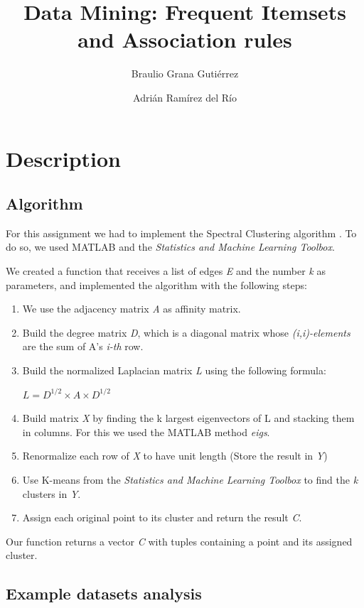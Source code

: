 \documentclass[12pt, a4paper]{article}
\title{Data Mining: Frequent Itemsets and Association rules}
\author{Braulio Grana Guti\'errez \and Adri\'an Ram\'irez del R\'io}
\begin{document}
\maketitle

\section{Description}

\subsection{Algorithm}
For this assignment we had to implement the Spectral Clustering algorithm \cite{speclust01}. To do so, we used MATLAB and the \emph{Statistics and Machine Learning Toolbox}.

We created a function that receives a list of edges \emph{E} and the number \emph{k} as parameters, and implemented the algorithm with the following steps:

\begin{enumerate}
\item We use the adjacency matrix \emph{A} as affinity matrix.
\item Build the degree matrix \emph{D}, which is a diagonal matrix whose \emph{(i,i)-elements} are the sum of A's \emph{i-th} row.
\item Build the normalized Laplacian matrix \emph{L} using the following formula:
\begin{center}
$L = D^{1/2} \times A \times D^{1/2}$
\end{center}
\item Build matrix \emph{X} by finding the k largest eigenvectors of L and stacking them in columns. For this we used the MATLAB method \emph{eigs}.
\item Renormalize each row of \emph{X} to have unit length (Store the result in \emph{Y})
\item Use K-means from the \emph{Statistics and Machine Learning Toolbox} to find the \emph{k} clusters in \emph{Y}.
\item Assign each original point to its cluster and return the result \emph{C}.

\end{enumerate}

Our function returns a vector \emph{C} with tuples containing a point and its assigned cluster. 

\subsection{Example datasets analysis}
\end{document}
